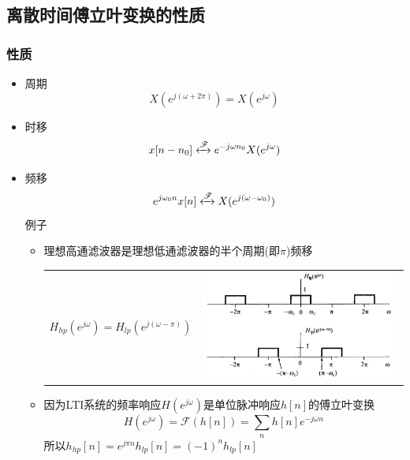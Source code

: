 \documentclass[CJKutf8,dvipsnames,table]{beamer}
\begin{document}
\begin{CJK*}{UTF8}{song}
	\section{离散时间傅立叶变换的性质}

  \begin{frame}
    \frametitle{性质}
    \begin{itemize}
    \item 周期
    \[
    	X(e^{j(\omega+2\pi)})=X(e^{j\omega})
	\]
    \item 时移
    \[
    	x[n-n_0] \xleftrightarrow{\mathscr{F}} e^{-j\omega n_0}X(e^{j\omega})
	\]
    \item 频移
    \[
    	e^{j\omega_0 n}x[n] \xleftrightarrow{\mathscr{F}} X(e^{j(\omega-\omega_0)})
	\]	
	例子
    	\begin{itemize}
    	\item 理想高通滤波器是理想低通滤波器的半个周期(即$\pi$)频移 \\
	\begin{tabular}{ll}
	\raisebox{-.5\height}

$H_{hp}(e^{j\omega})=H_{lp}(e^{j(\omega-\pi)})$

&
    \includegraphics[valign=m,scale=.28]{ss-c-f5-12}    \\
    \end{tabular}  
    	
		\item 因为LTI系统的频率响应$H(e^{j\omega})$是单位脉冲响应$h[n]$的傅立叶变换
		\[
			H(e^{j\omega})=\mathscr{F}(h[n])=\sum_n h[n]e^{-j\omega n}
		\]
		所以$h_{hp}[n]=e^{j\pi n}h_{lp}[n]=(-1)^nh_{lp}[n]$
		
    	\end{itemize}
	
	\end{itemize}
  \end{frame}   
  	 

\end{CJK*}
\end{document}

